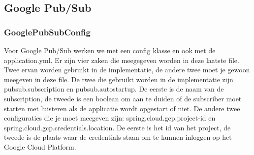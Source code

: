 \subsection{Google Pub/Sub}
\subsubsection{GooglePubSubConfig}
Voor Google Pub/Sub werken we met een config klasse en ook met de application.yml. Er zijn vier zaken die meegegeven worden in deze laatste file. Twee ervan worden gebruikt in de implementatie, de andere twee moet je gewoon meegeven in deze file. De twee die gebruikt worden in de implementatie zijn pubsub.subscription en pubsub.autostartup. De eerste is de naam van de subscription, de tweede is een boolean om aan te duiden of de subscriber moet starten met luisteren als de applicatie wordt opgestart of niet. De andere twee configuraties die je moet meegeven zijn: spring.cloud.gcp.project-id en spring.cloud.gcp.credentials.location. De eerste is het id van het project, de tweede is de plaats waar de credentials staan om te kunnen inloggen op het Google Cloud Platform. 

